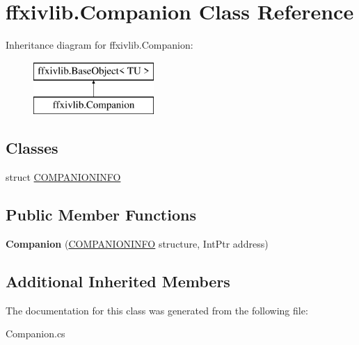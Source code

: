 \hypertarget{classffxivlib_1_1_companion}{\section{ffxivlib.\-Companion Class Reference}
\label{classffxivlib_1_1_companion}
}
Inheritance diagram for ffxivlib.\-Companion\-:\begin{figure}[H]
\begin{center}
\leavevmode
\includegraphics[height=2.000000cm]{classffxivlib_1_1_companion}
\end{center}
\end{figure}
\subsection*{Classes}
\begin{DoxyCompactItemize}
\item 
struct \hyperlink{structffxivlib_1_1_companion_1_1_c_o_m_p_a_n_i_o_n_i_n_f_o}{C\-O\-M\-P\-A\-N\-I\-O\-N\-I\-N\-F\-O}
\end{DoxyCompactItemize}
\subsection*{Public Member Functions}
\begin{DoxyCompactItemize}
\item 
\hypertarget{classffxivlib_1_1_companion_adfb0f0b9c89ac59c39071cc672cb89d5}{{\bfseries Companion} (\hyperlink{structffxivlib_1_1_companion_1_1_c_o_m_p_a_n_i_o_n_i_n_f_o}{C\-O\-M\-P\-A\-N\-I\-O\-N\-I\-N\-F\-O} structure, Int\-Ptr address)}\label{classffxivlib_1_1_companion_adfb0f0b9c89ac59c39071cc672cb89d5}

\end{DoxyCompactItemize}
\subsection*{Additional Inherited Members}


The documentation for this class was generated from the following file\-:\begin{DoxyCompactItemize}
\item 
Companion.\-cs\end{DoxyCompactItemize}
